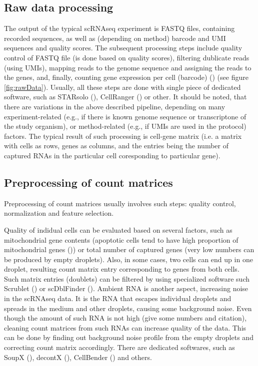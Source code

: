 \subsection{Raw data processing}

The output of the typical scRNAseq experiment is FASTQ files, containing recorded sequences,
as well as (depending on method) barcode and UMI sequences and quality scores.
The subsequent processing steps include quality control of FASTQ file (is done based on quality scores),
filtering dublicate reads (using UMIs), mapping reads to the genome sequence and assigning the reads to the genes,
and, finally, counting gene expression per cell (barcode) (\cite{Heumos2023}) (see figure \ref{fig:rawData}).
Usually, all these steps are done with single piece of dedicated software,
such as STARsolo (\cite{Kaminow2021}), CellRanger (\cite{Zheng2017}) or other.
It should be noted, that there are variations in the above described pipeline,
depending on many experiment-related (e.g., if there is known genome sequence or transcriptone of the study organism),
or method-related (e.g., if UMIs are used in the protocol) factors.
The typical result of such processing is cell-gene matrix (i.e. a matrix with cells as rows, genes as columns,
and the entries being the number of captured RNAs in the particular cell coresponding to particular gene).

\subsection{Preprocessing of count matrices}

Preprocessing of count matrices usually involves such steps:
quality control, normalization and feature selection.

Quality of indidual cells can be evaluated based on several factors, such as mitochondrial gene contents
(apoptotic cells tend to have high proportion of mitochondrial genes (\cite{Heumos2023})) or
total number of captured genes (very low numbers can be produced by empty droplets).
Also, in some cases, two cells can end up in one droplet,
resulting count matrix entry corresponding to genes from  both cells.
Such matrix entries (doublets) can be filtered by using specialized software
such Scrublet (\cite{Wolock2019}) or scDblFinder (\cite{Germain2022}).
Ambient RNA is another aspect, increasing noise in the scRNAseq data.
It is the RNA that escapes individual droplets and spreads in the medium and other droplets,
causing some background noise.
Even though the amount of such RNA is not high (give some numbers and citation),
cleaning count matrices from such RNAs can increase quality of the data.
This can be done by finding out background noise profile from the empty droplets and correcting count matrix accordingly.
There are dedicated softwares,
such as SoupX (\cite{Young2020}), decontX (\cite{Yang2020}), CellBender (\cite{Fleming2023}) and others.

